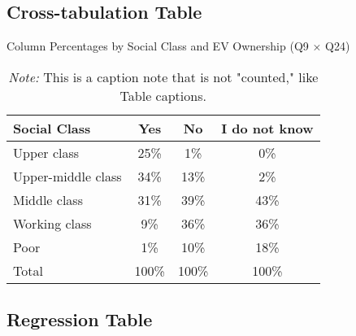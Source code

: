 \documentclass[10pt]{article}
\begin{document}
\newpage
\subsection*{Cross-tabulation Table}
\begin{table}[ht]
\centering
\caption{Column Percentages by Social Class and EV Ownership (Q9 × Q24)}
\label{tab:q9_q24_colpct}
\begin{tabular}{lccc}
\toprule
Social Class & Yes & No & I do not know \\
\midrule
Upper class        & 25\% & 1\% & 0\% \\
Upper-middle class & 34\% & 13\% & 2\% \\
Middle class       & 31\% & 39\% & 43\% \\
Working class      & 9\%  & 36\% & 36\% \\
Poor               & 1\%  & 10\% & 18\% \\
\midrule
Total              & 100\% & 100\% & 100\% \\
\bottomrule
\end{tabular}
\vspace{2mm}
\caption*{\textit{Note:} This is a caption note that is not "counted," like Table captions.}
\end{table}

\newpage
\subsection*{Regression Table}
\end{document}
